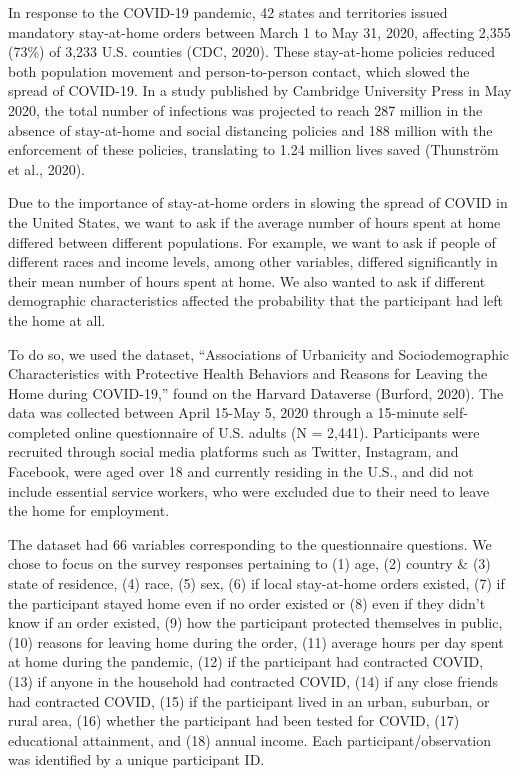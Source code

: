\documentclass[
  11 pt,
]{article}
\begin{document}
In response to the COVID-19 pandemic, 42 states and territories issued
mandatory stay-at-home orders between March 1 to May 31, 2020, affecting
2,355 (73\%) of 3,233 U.S. counties (CDC, 2020). These stay-at-home
policies reduced both population movement and person-to-person contact,
which slowed the spread of COVID-19. In a study published by Cambridge
University Press in May 2020, the total number of infections was
projected to reach 287 million in the absence of stay-at-home and social
distancing policies and 188 million with the enforcement of these
policies, translating to 1.24 million lives saved (Thunström et al.,
2020).

Due to the importance of stay-at-home orders in slowing the spread of
COVID in the United States, we want to ask if the average number of
hours spent at home differed between different populations. For example,
we want to ask if people of different races and income levels, among
other variables, differed significantly in their mean number of hours
spent at home. We also wanted to ask if different demographic
characteristics affected the probability that the participant had left
the home at all.

To do so, we used the dataset, ``Associations of Urbanicity and
Sociodemographic Characteristics with Protective Health Behaviors and
Reasons for Leaving the Home during COVID-19,'' found on the Harvard
Dataverse (Burford, 2020). The data was collected between April 15-May
5, 2020 through a 15-minute self-completed online questionnaire of U.S.
adults (N = 2,441). Participants were recruited through social media
platforms such as Twitter, Instagram, and Facebook, were aged over 18
and currently residing in the U.S., and did not include essential
service workers, who were excluded due to their need to leave the home
for employment.

The dataset had 66 variables corresponding to the questionnaire
questions. We chose to focus on the survey responses pertaining to (1)
age, (2) country \& (3) state of residence, (4) race, (5) sex, (6) if
local stay-at-home orders existed, (7) if the participant stayed home
even if no order existed or (8) even if they didn't know if an order
existed, (9) how the participant protected themselves in public, (10)
reasons for leaving home during the order, (11) average hours per day
spent at home during the pandemic, (12) if the participant had
contracted COVID, (13) if anyone in the household had contracted COVID,
(14) if any close friends had contracted COVID, (15) if the participant
lived in an urban, suburban, or rural area, (16) whether the participant
had been tested for COVID, (17) educational attainment, and (18) annual
income. Each participant/observation was identified by a unique
participant ID.
\end{document}
